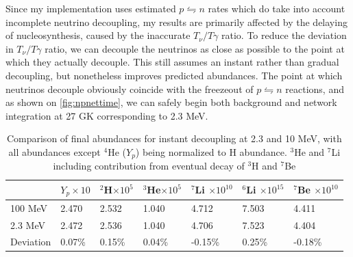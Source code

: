 Since my implementation uses estimated $p\leftrightharpoons n$ rates which do take into account incomplete neutrino decoupling, my results are primarily affected by the delaying of nucleosynthesis, caused by the inaccurate $T_\nu/T\gamma$ ratio. To reduce the deviation in $T_\nu/T\gamma$ ratio, we can decouple the neutrinos as close as possible to the point at which they actually decouple. This still assumes an instant rather than gradual decoupling, but nonetheless improves predicted abundances. The point at which neutrinos decouple obviously coincide with the freezeout of $p\leftrightharpoons n$ reactions, and as shown on \ref{fig:npnettime}, we can safely begin both background and network integration at 27 GK corresponding to 2.3 MeV. 
\begin{table}[ht]
    \begin{tabular}{l|llllll}
        & $Y_p \times 10$ & \hspace{-0.34em}$^{2}$H$ \times 10^{5}$ & \hspace{-0.34em}$^{3}$He$ \times 10^{5}$ & \hspace{-0.34em}$^{7}$Li $ \times 10^{10}$& \hspace{-0.34em}$^{6}$Li $ \times 10^{15}$& \hspace{-0.34em}$^{7}$Be $ \times 10^{10}$\\ \hline
    100 MeV & 2.470            & 2.532 & 1.040 & 4.712 & 7.503 & 4.411     \\ \hline
    2.3 MeV  & 2.472            & 2.536 & 1.040 & 4.706 & 7.523 & 4.404   \\ \hline
    Deviation & 0.07\%           & 0.15\% & 0.04\% & -0.15\% & 0.25\% & -0.18\%      
    \end{tabular}
    \caption{Comparison of final abundances for instant decoupling at 2.3 and 10 MeV, with all abundances except ${}^4$He ($Y_p$) being normalized to H abundance. ${}^3$He and ${}^7$Li including contribution from eventual decay of ${}^3$H and ${}^7$Be}
    \label{tab:earlylatedecoup}
\end{table}

